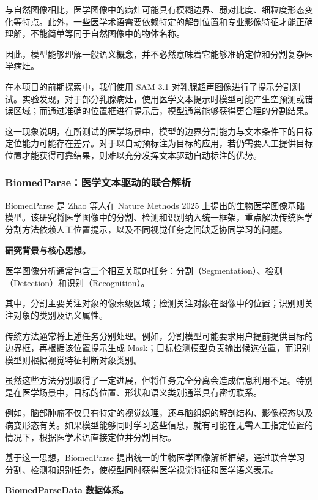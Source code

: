 \documentclass[10.5pt,compsoc]{CjC}
\theoremstyle{mystyle}
\begin{document}
与自然图像相比，医学图像中的病灶可能具有模糊边界、弱对比度、细粒度形态变化等特点。此外，一些医学术语需要依赖特定的解剖位置和专业影像特征才能正确理解，不能简单等同于自然图像中的物体名称。

因此，模型能够理解一般语义概念，并不必然意味着它能够准确定位和分割复杂医学病灶。

在本项目的前期探索中，我们使用 SAM 3.1 对乳腺超声图像进行了提示分割测试。实验发现，对于部分乳腺病灶，使用医学文本提示时模型可能产生空预测或错误区域；而通过准确的位置框进行提示后，模型通常能够获得更合理的分割结果。

这一现象说明，在所测试的医学场景中，模型的边界分割能力与文本条件下的目标定位能力可能存在差异。对于以自动预标注为目标的应用，若仍需要人工提供目标位置才能获得可靠结果，则难以充分发挥文本驱动自动标注的优势。


\subsubsection{BiomedParse：医学文本驱动的联合解析}

BiomedParse 是 Zhao 等人在 Nature Methods 2025 上提出的生物医学图像基础模型\cite{biomedparse2025}。该研究将医学图像中的分割、检测和识别纳入统一框架，重点解决传统医学分割方法依赖人工位置提示，以及不同视觉任务之间缺乏协同学习的问题。

\noindent\textbf{研究背景与核心思想。}

医学图像分析通常包含三个相互关联的任务：分割（Segmentation）、检测（Detection）和识别（Recognition）。

其中，分割主要关注对象的像素级区域；检测关注对象在图像中的位置；识别则关注对象的类别及语义属性。

传统方法通常将上述任务分别处理。例如，分割模型可能要求用户提前提供目标的边界框，再根据该位置提示生成 Mask；目标检测模型负责输出候选位置，而识别模型则根据视觉特征判断对象类别。

虽然这些方法分别取得了一定进展，但将任务完全分离会造成信息利用不足。特别是在医学场景中，目标的位置、形状和语义类别通常具有密切联系。

例如，脑部肿瘤不仅具有特定的视觉纹理，还与脑组织的解剖结构、影像模态以及病变形态有关。如果模型能够同时学习这些信息，就有可能在无需人工指定位置的情况下，根据医学术语直接定位并分割目标。

基于这一思想，BiomedParse 提出统一的生物医学图像解析框架，通过联合学习分割、检测和识别任务，使模型同时获得医学视觉特征和医学语义表示。

\noindent\textbf{BiomedParseData 数据体系。}
\end{document}
